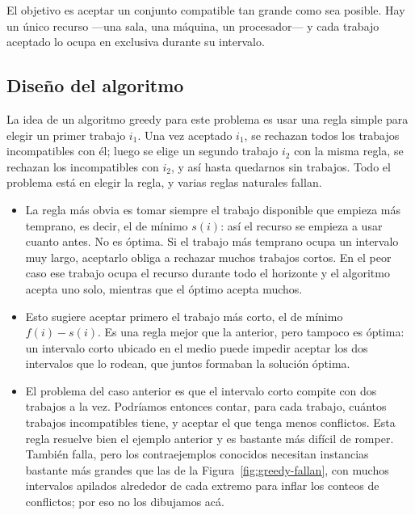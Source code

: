 \documentclass[12pt, spanish, oneside, openany]{book}
\theoremstyle{uprightplain}
\theoremstyle{definition}
\theoremstyle{remark}
\theoremstyle{definition}
\begin{document}
El objetivo es aceptar un conjunto compatible tan grande como sea posible. Hay un único recurso ---una sala, una máquina, un procesador--- y cada trabajo aceptado lo ocupa en exclusiva durante su intervalo.

\subsection{Diseño del algoritmo}

La idea de un algoritmo greedy para este problema es usar una regla simple para elegir un primer trabajo $i_1$. Una vez aceptado $i_1$, se rechazan todos los trabajos incompatibles con él; luego se elige un segundo trabajo $i_2$ con la misma regla, se rechazan los incompatibles con $i_2$, y así hasta quedarnos sin trabajos. Todo el problema está en elegir la regla, y varias reglas naturales fallan.

\begin{itemize}
    \item La regla más obvia es tomar siempre el trabajo disponible que empieza más temprano, es decir, el de mínimo $s(i)$: así el recurso se empieza a usar cuanto antes. No es óptima. Si el trabajo más temprano ocupa un intervalo muy largo, aceptarlo obliga a rechazar muchos trabajos cortos. En el peor caso ese trabajo ocupa el recurso durante todo el horizonte y el algoritmo acepta uno solo, mientras que el óptimo acepta muchos.

    \item Esto sugiere aceptar primero el trabajo más corto, el de mínimo $f(i)-s(i)$. Es una regla mejor que la anterior, pero tampoco es óptima: un intervalo corto ubicado en el medio puede impedir aceptar los dos intervalos que lo rodean, que juntos formaban la solución óptima.

    \item El problema del caso anterior es que el intervalo corto compite con dos trabajos a la vez. Podríamos entonces contar, para cada trabajo, cuántos trabajos incompatibles tiene, y aceptar el que tenga menos conflictos. Esta regla resuelve bien el ejemplo anterior y es bastante más difícil de romper. También falla, pero los contraejemplos conocidos necesitan instancias bastante más grandes que las de la Figura~\ref{fig:greedy-fallan}, con muchos intervalos apilados alrededor de cada extremo para inflar los conteos de conflictos; por eso no los dibujamos acá.
\end{itemize}
\end{document}

